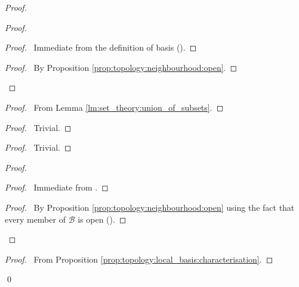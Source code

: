 \begin{proof}
  \pf
  \begin{proof}
    \begin{proof}
      \pf\ Immediate from the definition of basis ().
    \end{proof}
    \begin{proof}
      \pf\ By Proposition \ref{prop:topology:neighbourhood:open}.
    \end{proof}
  \end{proof}
  \begin{proof}
    \pf\ From Lemma \ref{lm:set_theory:union_of_subsets}.
  \end{proof}
  \begin{proof}
    \pf\ Trivial.
  \end{proof}
  \begin{proof}
    \pf\ Trivial.
  \end{proof}
  \begin{proof}
    \pf
    \begin{proof}
      \pf\ Immediate from .
    \end{proof}
    \begin{proof}
      \pf\ By Proposition \ref{prop:topology:neighbourhood:open} using the
      fact that every member of $\mathcal{B}$ is open ().
    \end{proof}
  \end{proof}
  \begin{proof}
    \pf\ From Proposition \ref{prop:topology:local_basis:characterisation}.
  \end{proof}
  \qed
\end{proof}

